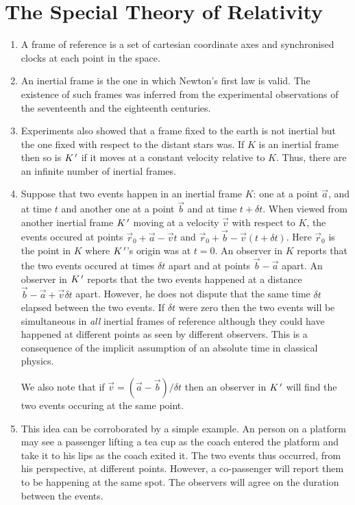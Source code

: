 \chapter{The Special Theory of Relativity}\label{c1}
\begin{enumerate}
\item A frame of reference is a set of cartesian coordinate axes and 
synchronised clocks at each point in the space.

\item An inertial frame is the one in which Newton's first law is valid. The 
existence of such frames was inferred from the experimental observations of the
seventeenth and the eighteenth centuries.

\item Experiments also showed that a frame fixed to the earth is not inertial
but the one fixed with respect to the distant stars was. If $K$ is an inertial
frame then so is $K^{\,\prime}$ if it moves at a constant velocity relative
to $K$. Thus, there are an infinite number of inertial frames.

\item Suppose that two events happen in an inertial frame $K$: one at a point
$\vec{a}$, and at time $t$ and another one at a point $\vec{b}$ and at time 
$t + \delta t$. When viewed from another inertial frame $K^{\,\prime}$ moving at a 
velocity $\vec{v}$ with respect to $K$, the events occured at points $\vec{r}_0 
+ \vec{a} - \vec{v}t$ and $\vec{r}_0 + \vec{b} -\vec{v}(t + \delta t)$. Here 
$\vec{r}_0$ is the point in $K$ where $K^{\,\prime}$'s origin was at $t=0$. An observer 
in $K$ reports that the two events occured at times $\delta t$ apart and at points 
$\vec{b} - \vec{a}$ apart. An observer in $K^{\,\prime}$ reports that the two events 
happened at a distance $\vec{b} - \vec{a} + \vec{v}\delta t$ apart. However, 
he does not dispute that the same time $\delta t$ elapsed between the two events. 
If $\delta t$ were zero then the two events will be simultaneous in \emph{all} 
inertial frames of reference although they could have happened at different 
points as seen by different observers. This is a consequence of the implicit 
assumption of an absolute time in classical physics.

We also note that if $\vec{v} = (\vec{a} - \vec{b})/\delta t$ then an observer
in $K^{\,\prime}$ will find the two events occuring at the same point.

\item This idea can be corroborated by a simple example. An person on a platform may
see a passenger lifting a tea cup as the coach entered the platform and take it
to his lips as the coach exited it. The two events thus occurred, from his 
perspective, at different points. However, a co-passenger will report them to
be happening at the same spot. The observers will agree on the duration between
the events.


\end{enumerate}
